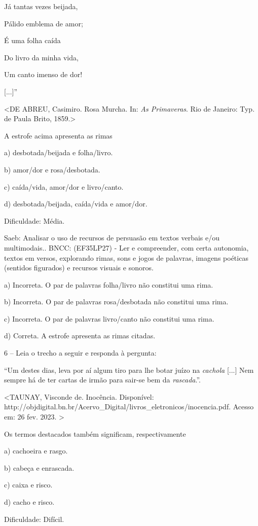 Já tantas vezes beijada,

Pálido emblema de amor;

É uma folha caída

Do livro da minha vida,

Um canto imenso de dor!

{[}...{]}''

\textless{}DE ABREU, Casimiro. Rosa Murcha. In: \emph{As Primaveras}.
Rio de Janeiro: Typ. de Paula Brito, 1859.\textgreater{}

A estrofe acima apresenta as rimas

a) desbotada/beijada e folha/livro.

b) amor/dor e rosa/desbotada.

c) caída/vida, amor/dor e livro/canto.

d) desbotada/beijada, caída/vida e amor/dor.

Dificuldade: Média.

Saeb: Analisar o uso de recursos de persuasão em textos verbais e/ou
multimodais.. BNCC: (EF35LP27) - Ler e compreender, com certa autonomia,
textos em versos, explorando rimas, sons e jogos de palavras, imagens
poéticas (sentidos figurados) e recursos visuais e sonoros.

a) Incorreta. O par de palavras folha/livro não constitui uma rima.

b) Incorreta. O par de palavras rosa/desbotada não constitui uma rima.

c) Incorreta. O par de palavras livro/canto não constitui uma rima.

d) Correta. A estrofe apresenta as rimas citadas.

6 -- Leia o trecho a seguir e responda à pergunta:

``Um destes dias, leva por aí algum tiro para lhe botar juízo na
\emph{cachola} {[}...{]} Nem sempre há de ter cartas de irmão para
sair-se bem da \emph{rascada}.''.

\textless{}TAUNAY, Visconde de. Inocência. Disponível:
http://objdigital.bn.br/Acervo\_Digital/livros\_eletronicos/inocencia.pdf.
Acesso em: 26 fev. 2023. \textgreater{}

Os termos destacados também significam, respectivamente

a) cachoeira e rasgo.

b) cabeça e enrascada.

c) caixa e risco.

d) cacho e risco.

Dificuldade: Difícil.

